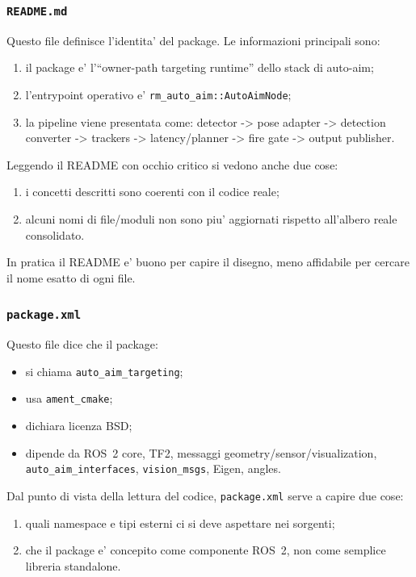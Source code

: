 \documentclass[11pt,a4paper]{article}
\newcommand{\code}[1]{\texttt{#1}}
\begin{document}
\subsubsection{\code{README.md}}

Questo file definisce l'identita' del package. Le informazioni principali sono:
\begin{enumerate}[leftmargin=1.4em]
  \item il package e' l'``owner-path targeting runtime'' dello stack di auto-aim;
  \item l'entrypoint operativo e' \code{rm\_auto\_aim::AutoAimNode};
  \item la pipeline viene presentata come: detector -> pose adapter -> detection converter -> trackers -> latency/planner -> fire gate -> output publisher.
\end{enumerate}

Leggendo il README con occhio critico si vedono anche due cose:
\begin{enumerate}[leftmargin=1.4em]
  \item i concetti descritti sono coerenti con il codice reale;
  \item alcuni nomi di file/moduli non sono piu' aggiornati rispetto all'albero reale consolidato.
\end{enumerate}

In pratica il README e' buono per capire il disegno, meno affidabile per cercare il nome esatto di ogni file.

\subsubsection{\code{package.xml}}

Questo file dice che il package:
\begin{itemize}[leftmargin=1.4em]
  \item si chiama \code{auto\_aim\_targeting};
  \item usa \code{ament\_cmake};
  \item dichiara licenza BSD;
  \item dipende da ROS~2 core, TF2, messaggi geometry/sensor/visualization, \code{auto\_aim\_interfaces}, \code{vision\_msgs}, Eigen, angles.
\end{itemize}

Dal punto di vista della lettura del codice, \code{package.xml} serve a capire due cose:
\begin{enumerate}[leftmargin=1.4em]
  \item quali namespace e tipi esterni ci si deve aspettare nei sorgenti;
  \item che il package e' concepito come componente ROS~2, non come semplice libreria standalone.
\end{enumerate}
\end{document}

